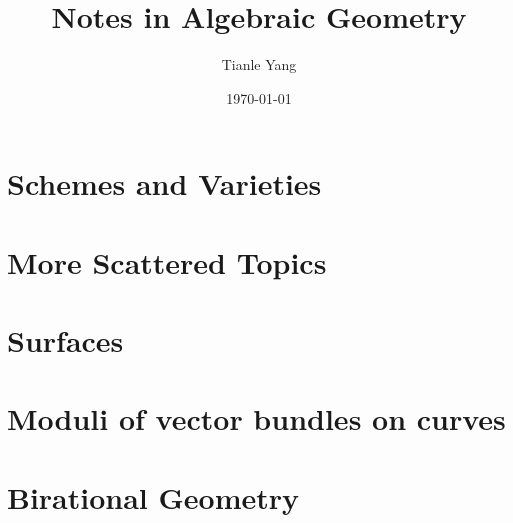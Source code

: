 \documentclass[sectionlevel=book]{noteformyself}
\title{Notes in Algebraic Geometry}
\author{Tianle Yang}
\date{\today}
\begin{document}
    \maketitle

    \frontmatter

    \tableofcontents

    \mainmatter

    \chapter{Schemes and Varieties}
        \setcounter{section}{-1}
        
        
        
        
        
        

    \chapter{More Scattered Topics}

    \chapter{Surfaces}
        
        
        
        
        
        
        

    \chapter{Moduli of vector bundles on curves}
        

    \chapter{Birational Geometry}
        
        
        
\end{document}
